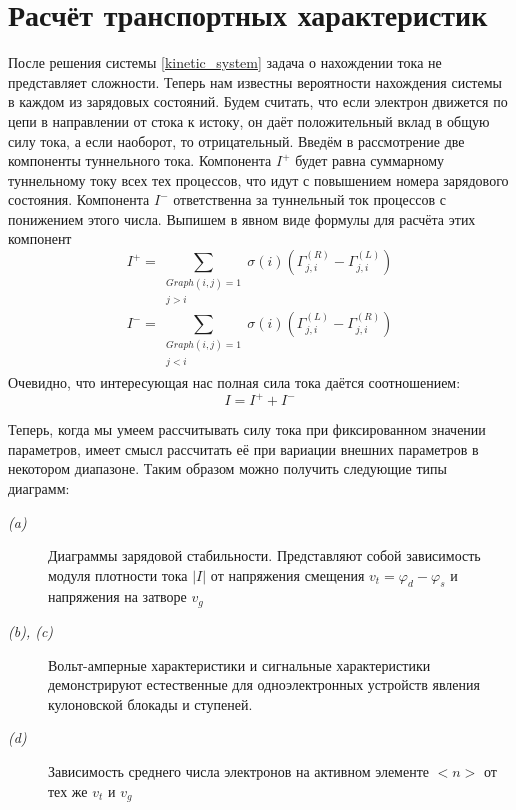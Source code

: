 \documentclass[12pt,a4paper]{report}
\begin{document}
\section{Расчёт транспортных характеристик}
После решения системы \ref{kinetic_system} задача о нахождении тока не представляет сложности. Теперь нам известны вероятности нахождения системы в каждом из зарядовых состояний. Будем считать, что если электрон движется по цепи в направлении от стока к истоку, он даёт положительный вклад в общую силу тока, а если наоборот, то отрицательный. Введём в рассмотрение две компоненты туннельного тока. Компонента $I^+$ будет равна суммарному туннельному току всех тех процессов, что идут с повышением номера зарядового состояния. Компонента $I^-$ ответственна за туннельный ток процессов с понижением этого числа. Выпишем в явном виде формулы для расчёта этих компонент
\begin{equation}\label{i_plus}
I^+ = \sum\limits_{
\begin{array}{c}
Graph(i,j) = 1 \\
 j > i \\
\end{array}
} \sigma(i)(\Gamma_{j,i}^{(R)} - \Gamma_{j,i}^{(L)})
\end{equation}
\begin{equation}\label{i_minus}
I^- = \sum\limits_{
\begin{array}{c}
Graph(i,j) = 1 \\
 j < i \\
\end{array}
} \sigma(i)(\Gamma_{j,i}^{(L)} - \Gamma_{j,i}^{(R)})
\end{equation}
Очевидно, что интересующая нас полная сила тока даётся соотношением:
\begin{equation}\label{i}
I = I^+ + I^-
\end{equation}

Теперь, когда мы умеем рассчитывать силу тока при фиксированном значении параметров, имеет смысл рассчитать её при вариации внешних параметров в некотором диапазоне. Таким образом можно получить следующие типы диаграмм:
\begin{description}

\item[\itshape (a)] Диаграммы зарядовой стабильности. Представляют собой зависимость модуля плотности тока $|I|$ от напряжения смещения $v_t = \varphi_d - \varphi_s$ и напряжения на затворе $v_g$
\item[\itshape (b), (c)] Вольт-амперные характеристики и сигнальные характеристики демонстрируют естественные для одноэлектронных устройств явления кулоновской блокады и ступеней.
\item[\itshape (d)] Зависимость среднего числа электронов на активном элементе $<n>$ от тех же $v_t$ и $v_g$
\end{description}
\end{document}
